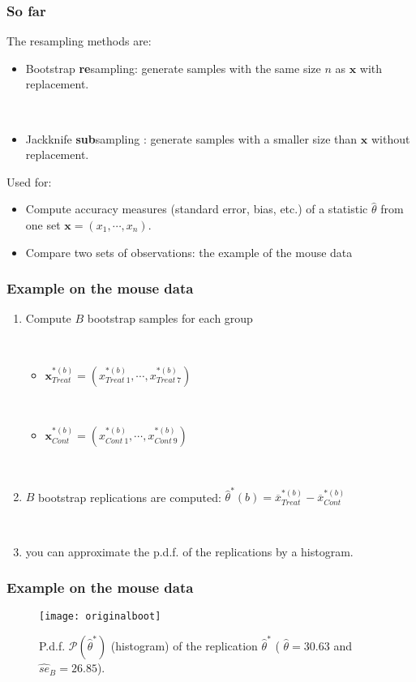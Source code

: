\frame
{
\frametitle{So far}

The resampling methods are:
\begin{itemize}
\item Bootstrap \textbf{re}sampling: generate samples with the same size $n$ as $\mathbf{x}$  with replacement.

\

\item Jackknife \textbf{sub}sampling : generate samples with a smaller size  than $\mathbf{x}$  without replacement.
\end{itemize}

Used for:
\begin{itemize}
\item Compute accuracy measures (standard error, bias, etc.) of a statistic $\hat{\theta}$ from one set $\mathbf{x}=(x_1,\cdots,x_n)$.

\item Compare two sets of observations:  the example of the mouse data
\end{itemize} 

}


\frame
{
\frametitle{Example on the mouse data}


\begin{enumerate}
\item  Compute $B$ bootstrap samples for each group

\

\begin{itemize}
\item  $\mathbf{x}_{Treat}^{*(b)}=(x_{Treat\ 1}^{*(b)},\cdots,x_{Treat\ 7}^{*(b)})$ 

\

\item $\mathbf{x}_{Cont}^{*(b)}=(x_{Cont\ 1}^{*(b)},\cdots,x_{Cont\ 9}^{*(b)})$
\end{itemize}

\

\item $B$ bootstrap replications are computed: $\hat{\theta}^{*}(b)=\overline{x}^{*(b)}_{Treat}-\overline{x}^{*(b)}_{Cont}$

\

\item you can approximate the p.d.f. of the replications by a histogram.  

\end{enumerate}

}
\frame
{
\frametitle{Example on the mouse data}

\begin{figure}
\texttt{[image: originalboot]}
\caption{P.d.f. $\mathcal{P}(\hat{\theta}^{*})$ (histogram)  of the replication $\hat{\theta}^{*}$ ( $\hat{\theta}=30.63$
and $\hat{se}_B=26.85$).}
\end{figure}

}


